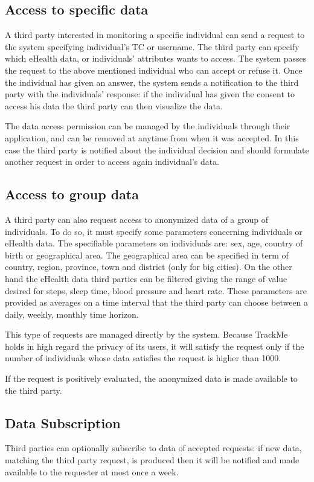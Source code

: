 \subsection{Access to specific data}
A third party interested in monitoring a specific individual can send a request to the system specifying individual's TC or username. The third party can specify which eHealth data, or individuals' attributes wants to access.
The system passes the request to the above mentioned individual who can accept or refuse it.
Once the individual has given an answer, the system sends a notification to the third party with the individuals' response: if the individual has given the consent to access his data the third party can then visualize the data.

The data access permission can be managed by the individuals through their application, and can be removed at anytime from when it was accepted. 
In this case the third party is notified about the individual decision and should formulate another request in order to access again individual's data. 




\subsection{Access to group data}
A third party can also request access to anonymized data of a group of individuals.
To do so, it must specify some parameters concerning individuals or eHealth data.
The specifiable parameters on individuals are: sex, age, country of birth or geographical area.
The geographical area can be specified in term of country, region, province, town and district (only for big cities).
On the other hand the eHealth data third parties can be filtered giving the range of value desired for steps, sleep time, blood pressure and heart rate. These parameters are provided as averages on a time interval that the third party can choose between a daily, weekly, monthly time horizon.

This type of requests are managed directly by the system. Because TrackMe holds in high regard the privacy of its users, it will satisfy the request only if the number of individuals whose data satisfies the request is higher than 1000.

If the request is positively evaluated, the anonymized data is made available to the third party.

\subsection{Data Subscription}
Third parties can optionally subscribe to data of accepted requests: if new data, matching the third party request, is produced then it will be notified and made available to the requester at most once a week.

